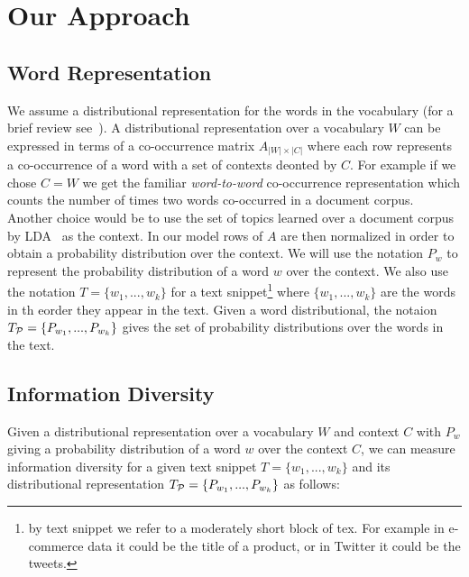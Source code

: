 \documentclass{article} %
\begin{document}

\section{Our Approach}
\label{sec:our-approach}

\subsection{Word Representation}
\label{sec:word-representation}

We assume a distributional representation for the words in the vocabulary (for a brief review see~\cite{Turian10wordrepresentations}). A distributional representation over a vocabulary $W$ can be expressed in terms of a co-occurrence  matrix $A_{|W|\times|C|}$ where each row represents a co-occurrence of a word with a set of contexts deonted by $C$. For example if we chose $C=W$ we get the familiar {\sl  word-to-word} co-occurrence representation which counts the number of times two words co-occurred in a document corpus. Another choice would be to use the set of topics learned over a document corpus by LDA~\cite{Blei:2003:LDA:944919.944937} as the context. In our model rows of $A$ are then normalized in order to obtain a probability distribution over the context. We will use the notation $P_w$ to represent the probability distribution of a word $w$ over the context. We also use the notation $T=\{w_1,...,w_k\}$ for a text snippet\footnote{by text snippet we refer to a moderately short block of tex. For example in e-commerce data it could be the title of a product, or in Twitter it could be the tweets.} where $\{w_1,...,w_k\}$ are the words in th eorder they appear in the text. Given a word distributional, the notaion $T_{{\mathcal P}}=\{P_{w_1},...,P_{w_k}\}$ gives the set of probability distributions over the words in the text. 


\subsection{Information Diversity}
\label{sec:information-diversity}

Given a distributional representation over a vocabulary $W$ and context $C$ with $P_w$ giving a probability distribution of a word $w$ over the context $C$, we can measure information diversity for a given text snippet $T=\{w_1,...,w_k\}$ and its distributional representation $T_{{\mathcal P}}=\{P_{w_1},...,P_{w_k}\}$ as follows:
\end{document}

